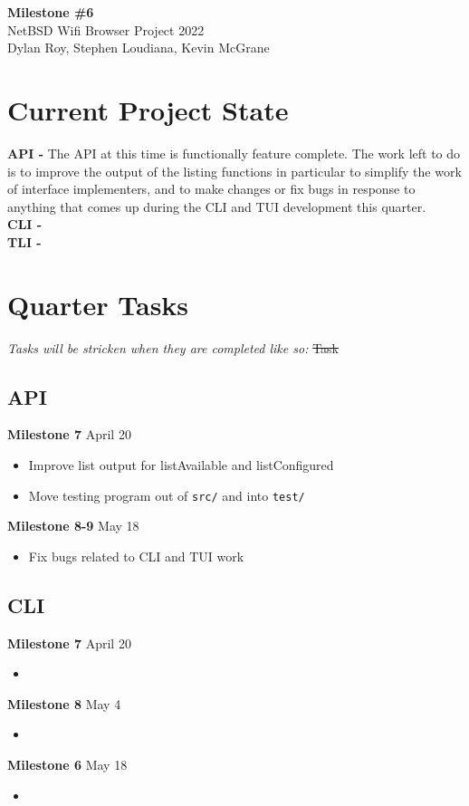 \documentclass[11pt]{article}
\begin{document}
\begin{center}
  \textbf{\Large Milestone \#6}\\\large NetBSD Wifi Browser Project 2022\\
  Dylan Roy, Stephen Loudiana, Kevin McGrane
\end{center}


\section*{Current Project State}
\textbf{API -} The API at this time is functionally feature complete.
The work left to do is to improve the output of the listing functions in
particular to simplify the work of interface implementers, and to make
changes or fix bugs in response to anything that comes up during the CLI
and TUI development this quarter.\\

\textbf{CLI -} \\

\textbf{TLI -} \\

\section*{Quarter Tasks}

\textit{Tasks will be stricken when they are completed like so:} \sout{Task}

\subsection*{API}
\textbf{Milestone 7} April 20
\begin{itemize}
  \item Improve list output for listAvailable and listConfigured
  \item Move testing program out of \texttt{src/} and into \texttt{test/}
\end{itemize}
\textbf{Milestone 8-9} May 18
\begin{itemize}
  \item Fix bugs related to CLI and TUI work
\end{itemize}

\subsection*{CLI}
\textbf{Milestone 7} April 20
\begin{itemize}
  \item
\end{itemize}
\textbf{Milestone 8} May 4
\begin{itemize}
  \item
\end{itemize}
\textbf{Milestone 6} May 18
\begin{itemize}
  \item
\end{itemize}
\end{document}
